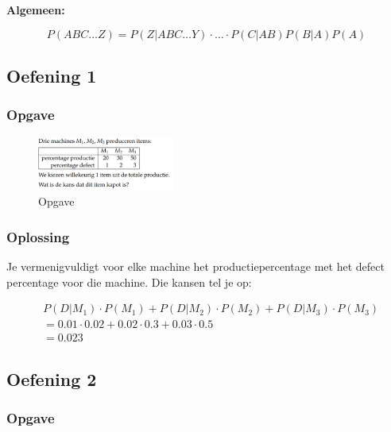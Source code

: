 \documentclass{article}
\begin{document}
\textbf{Algemeen:}

\begin{equation}
    P(ABC\dots Z) = P(Z|ABC\dots Y) \cdot \dots \cdot P (C| A B ) P (B|A) P(A)
\end{equation}

\subsection{Oefening 1}

\subsubsection{Opgave}

\begin{figure}[H]
    \centering
    \includegraphics[width=0.4\textwidth]{voorwaardelijke-kans-oef1.png}
    \caption{Opgave}
\end{figure}

\subsubsection{Oplossing}

Je vermenigvuldigt voor elke machine het productiepercentage met het defect percentage voor die machine. 
Die kansen tel je op:

\begin{center}
    \begin{align}
        & P(D | M_1) \cdot P(M_1) + P(D | M_2) \cdot P(M_2) + P(D | M_3) \cdot P(M_3)\\
        & = 0.01 \cdot 0.02 + 0.02 \cdot 0.3 + 0.03 \cdot 0.5 \\
        & = 0.023
    \end{align}
\end{center}

\subsection{Oefening 2}

\subsubsection{Opgave}
\end{document}
